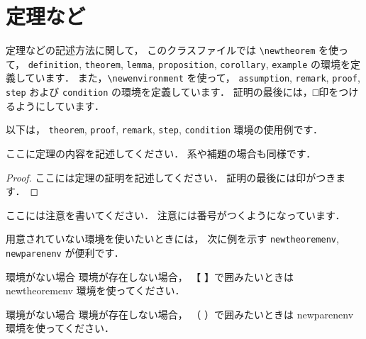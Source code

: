 \documentclass[J]{scitrans}
\begin{document}


\section{定理など}
\label{sec:theorem}

定理などの記述方法に関して，
このクラスファイルでは \verb+\newtheorem+ を使って，
\verb+definition+, \verb+theorem+, \verb+lemma+, \verb+proposition+,
\verb+corollary+, \verb+example+ の環境を定義しています．
また，\verb+\newenvironment+ を使って，
\verb+assumption+, \verb+remark+, \verb+proof+,
\verb+step+ および \verb+condition+ の環境を定義しています．
証明の最後には，□印をつけるようにしています．

以下は，
\verb+theorem+, \verb+proof+, \verb+remark+, \verb+step+,
\verb+condition+ 環境の使用例です．

\begin{theorem}
  \label{theorem:1}
  ここに定理の内容を記述してください．
  系や補題の場合も同様です．
\end{theorem}

\begin{proof}
  ここには定理の証明を記述してください．
  証明の最後には印がつきます．
\end{proof}

\begin{remark}
  \label{remark:1}
  ここには注意を書いてください．
  注意には番号がつくようになっています．
\end{remark}

用意されていない環境を使いたいときには，
次に例を示す \verb+newtheoremenv+, \verb+newparenenv+ が便利です．

\begin{newtheoremenv}{環境がない場合}
  環境が存在しない場合，
  【 】で囲みたいときは newtheoremenv 環境を使ってください．
\end{newtheoremenv}
\begin{newparenenv}{環境がない場合}
  環境が存在しない場合，
  （ ）で囲みたいときは newparenenv 環境を使ってください．
\end{newparenenv}
\end{document}

